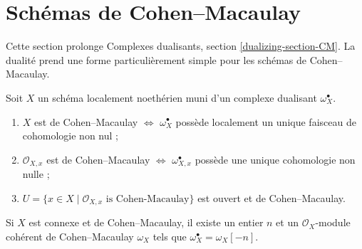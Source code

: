 \section{Schémas de Cohen–Macaulay}
\label{section-CM}

\noindent
Cette section prolonge Complexes dualisants, section \ref{dualizing-section-CM}. La dualité prend une forme particulièrement simple pour les schémas de Cohen–Macaulay.

\begin{lemma}
\label{lemma-dualizing-module-CM-scheme}
Soit $X$ un schéma localement noethérien muni d'un complexe dualisant $\omega_X^\bullet$.
\begin{enumerate}
\item $X$ est de Cohen–Macaulay $\Leftrightarrow$ $\omega_X^\bullet$ possède localement un unique faisceau de cohomologie non nul ;
\item $\mathcal{O}_{X, x}$ est de Cohen–Macaulay $\Leftrightarrow$ $\omega_{X, x}^\bullet$ possède une unique cohomologie non nulle ;
\item $U = \{x \in X \mid \mathcal{O}_{X, x}\text{ is Cohen-Macaulay}\}$ est ouvert et de Cohen–Macaulay.
\end{enumerate}
Si $X$ est connexe et de Cohen–Macaulay, il existe un entier $n$ et un $\mathcal{O}_X$-module cohérent de Cohen–Macaulay $\omega_X$ tels que $\omega_X^\bullet = \omega_X[-n]$.
\end{lemma}

